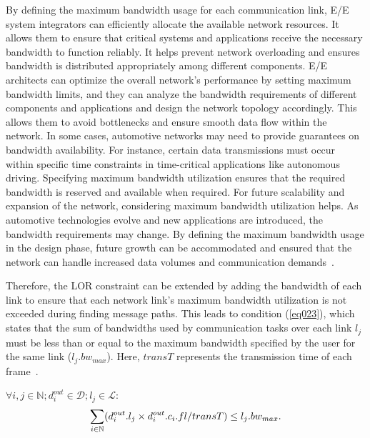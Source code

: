    By defining the maximum bandwidth usage for each communication link, E/E system integrators can efficiently allocate the available network resources. It allows them to ensure that critical systems and applications receive the necessary bandwidth to function reliably. It helps prevent network overloading and ensures bandwidth is distributed appropriately among different components.
    E/E architects can optimize the overall network's performance by setting maximum bandwidth limits, and they can analyze the bandwidth requirements of different components and applications and design the network topology accordingly. This allows them to avoid bottlenecks and ensure smooth data flow within the network. In some cases, automotive networks may need to provide guarantees on bandwidth availability. For instance, certain data transmissions must occur within specific time constraints in time-critical applications like autonomous driving. Specifying maximum bandwidth utilization ensures that the required bandwidth is reserved and available when required.
    For future scalability and expansion of the network, considering maximum bandwidth utilization helps. As automotive technologies evolve and new applications are introduced, the bandwidth requirements may change. By defining the maximum bandwidth usage in the design phase, future growth can be accommodated and ensured that the network can handle increased data volumes and communication demands~\cite{askaripoor2023designer}.
    
    Therefore, the LOR constraint can be extended by adding the bandwidth of each link to ensure that each network link's maximum bandwidth utilization is not exceeded during finding message paths. This leads to condition (\ref{eq023}), which states that the sum of bandwidths used by communication tasks over each link $l_j$ must be less than or equal to the maximum bandwidth specified by the user for the same link ($l_{j}.bw_{max}$). Here, $transT$ represents the transmission time of each frame~\cite{askaripoor2023designer}.\newline
    
    $\forall i,j \in \mathbb{N}; d_i^{out} \in\mathcal{D}; l_j \in\mathcal{L}$:
        \begin{equation}
    	\small
    	     \sum_{i \in \mathbb{N}} (d_i^{out}.l_{j} \times  d_i^{out}.c_{i}.fl/transT) \leq l_{j}.bw_{max}.
    	\label{eq023}
    \end{equation}
    
